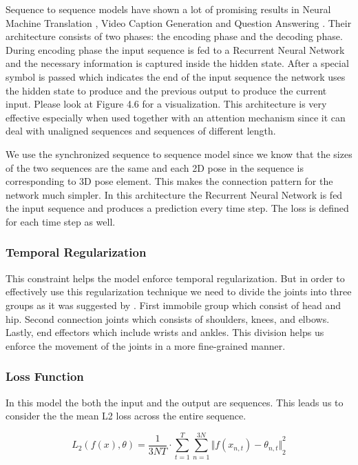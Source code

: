 Sequence to sequence models \parencite{sutskever2014sequence} have shown a lot of promising results in Neural Machine Translation \parencite{bahdanau2014neural}, Video Caption Generation \parencite{xu2015show} and Question Answering \parencite{hermann2015teaching}. Their architecture consists of two phases: the encoding phase and the decoding phase. During encoding phase the input sequence is fed to a Recurrent Neural Network and the necessary information is captured inside the hidden state. After a special  symbol is passed which indicates the end of the input sequence the network uses the hidden state to produce and the previous output to produce the current input. Please look at Figure 4.6 for a visualization. This architecture is very effective especially when used together with an attention mechanism since it can deal with unaligned sequences and sequences of different length.

We use the synchronized sequence to sequence model since we know that the sizes of the two sequences are the same and each 2D pose in the sequence is corresponding to 3D pose element. This makes the connection pattern for the network much simpler. In this architecture the Recurrent Neural Network is fed the input sequence and produces a prediction every time step. The loss is defined for each time step as well.

\subsubsection{Temporal Regularization}

This constraint helps the model enforce temporal regularization. But in order to effectively use this regularization technique we need to divide the joints into three groups as it was suggested by \parencite{hossain2017understanding}. First immobile group which consist of head and hip. Second connection joints which consists of shoulders, knees, and elbows. Lastly, end effectors which include wrists and ankles. This division helps us enforce the movement of the joints in a more fine-grained manner.

\subsubsection{Loss Function}

In this model the both the input and the output are sequences. This leads us to consider the the mean L2 loss across the entire sequence.

\begin{equation}	
    L_2(f(x),\theta) = \frac{1}{3NT} \cdot \sum_{t=1}^{T} \sum_{n=1}^{3N} {\Vert f(x_{n,t})-\theta_{n,t} \Vert}_2^2
\end{equation}

